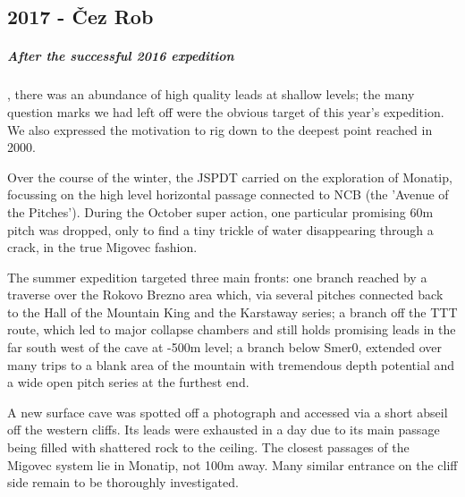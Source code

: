\newpage
  
\begin{tcolorbox}

\chapter{2017 - Čez Rob}
	\paragraph{After the successful 2016 expedition}, there was an abundance of high quality leads at shallow levels; the many question marks we had left off were the obvious target of this year's expedition. We also expressed the motivation to rig down to the deepest point reached in 2000.

	Over the course of the winter, the JSPDT carried on the exploration of Monatip, focussing on the high level horizontal passage connected to NCB (the 'Avenue of the Pitches'). During the October super action, one particular promising 60m pitch was dropped, only to find a tiny trickle of water disappearing through a crack, in the true Migovec fashion.

	The summer expedition targeted three main fronts: one branch reached by a traverse over the Rokovo Brezno area which, via several pitches connected back to the Hall of the Mountain King and the Karstaway series; a branch off the TTT route, which led to major collapse chambers and still holds promising leads in the far south west of the cave at -500m level; a branch below Smer0, extended over many trips to a blank area of the mountain with tremendous depth potential and a wide open pitch series at the furthest end.

	A new surface cave was spotted off a photograph and accessed via a short abseil off the western cliffs. Its leads were exhausted in a day due to its main passage being filled with shattered rock to the ceiling. The closest passages of the Migovec system lie in Monatip, not 100m away. Many similar entrance on the cliff side remain to be thoroughly investigated.
	\\
	\\
	\\
\end{tcolorbox}

\BgThispage
